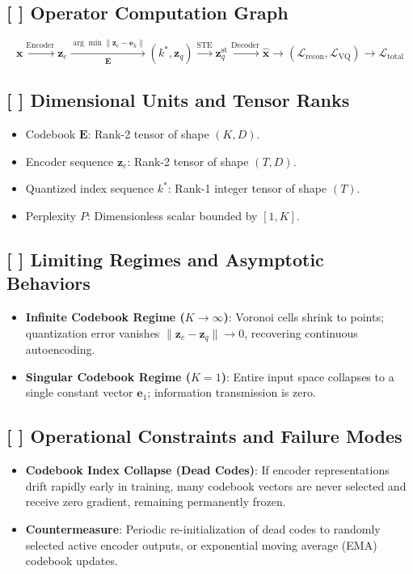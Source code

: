 \documentclass[11pt,a4paper]{article}
\theoremstyle{definition}
\begin{document}
\subsection{[ ] Operator Computation Graph}
{\boldmath
\begin{equation}
\mathbf{x} \xrightarrow{\text{Encoder}} \mathbf{z}_e \xrightarrow[\mathbf{E}]{\arg\min \|\mathbf{z}_e - \mathbf{e}_k\|} (k^*, \mathbf{z}_q) \xrightarrow{\text{STE}} \mathbf{z}_q^{\text{st}} \xrightarrow{\text{Decoder}} \hat{\mathbf{x}} \longrightarrow (\mathcal{L}_{\text{recon}}, \mathcal{L}_{\text{VQ}}) \to \mathcal{L}_{\text{total}}
\end{equation}
}

\subsection{[ ] Dimensional Units and Tensor Ranks}
\begin{itemize}
    \item Codebook $\mathbf{E}$: Rank-2 tensor of shape $(K, D)$.
    \item Encoder sequence $\mathbf{z}_e$: Rank-2 tensor of shape $(T, D)$.
    \item Quantized index sequence $k^*$: Rank-1 integer tensor of shape $(T)$.
    \item Perplexity $P$: Dimensionless scalar bounded by $[1, K]$.
\end{itemize}

\subsection{[ ] Limiting Regimes and Asymptotic Behaviors}
\begin{itemize}
    \item \textbf{Infinite Codebook Regime ($K \to \infty$)}: Voronoi cells shrink to points; quantization error vanishes $\|\mathbf{z}_e - \mathbf{z}_q\| \to 0$, recovering continuous autoencoding.
    \item \textbf{Singular Codebook Regime ($K = 1$)}: Entire input space collapses to a single constant vector $\mathbf{e}_1$; information transmission is zero.
\end{itemize}

\subsection{[ ] Operational Constraints and Failure Modes}
\begin{itemize}
    \item \textbf{Codebook Index Collapse (Dead Codes)}: If encoder representations drift rapidly early in training, many codebook vectors are never selected and receive zero gradient, remaining permanently frozen.
    \item \textbf{Countermeasure}: Periodic re-initialization of dead codes to randomly selected active encoder outputs, or exponential moving average (EMA) codebook updates.
\end{itemize}
\end{document}

